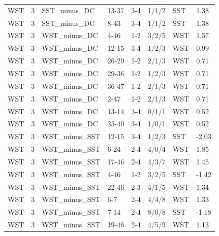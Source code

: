 \begin{table}[!h]
\begin{tabular}[t]{lrllllll}
WST & 3 & SST_minus_DC & 13-37 & 3-4 & 1/1/2 & SST & 1.38\\
WST & 3 & SST_minus_DC & 8-43 & 3-4 & 1/1/2 & SST & 1.38\\
WST & 3 & WST_minus_DC & 4-46 & 1-2 & 3/2/5 & WST & 1.57\\
WST & 3 & WST_minus_DC & 12-15 & 3-4 & 1/2/3 & WST & 0.99\\
\addlinespace
WST & 3 & WST_minus_DC & 26-29 & 1-2 & 2/1/3 & WST & 0.71\\
WST & 3 & WST_minus_DC & 29-36 & 1-2 & 1/2/3 & WST & 0.71\\
WST & 3 & WST_minus_DC & 36-47 & 1-2 & 2/1/3 & WST & 0.71\\
WST & 3 & WST_minus_DC & 2-47 & 1-2 & 2/1/3 & WST & 0.71\\
WST & 3 & WST_minus_DC & 13-14 & 3-4 & 0/1/1 & WST & 0.52\\
\addlinespace
WST & 3 & WST_minus_DC & 35-40 & 3-4 & 1/0/1 & WST & 0.52\\
WST & 3 & WST_minus_SST & 12-15 & 3-4 & 1/2/3 & SST & -2.03\\
WST & 3 & WST_minus_SST & 6-24 & 2-4 & 4/0/4 & WST & 1.85\\
WST & 3 & WST_minus_SST & 17-46 & 2-4 & 4/3/7 & WST & 1.45\\
WST & 3 & WST_minus_SST & 4-46 & 1-2 & 3/2/5 & SST & -1.42\\
\addlinespace
WST & 3 & WST_minus_SST & 22-46 & 2-3 & 4/1/5 & WST & 1.34\\
WST & 3 & WST_minus_SST & 6-7 & 2-4 & 4/4/8 & WST & 1.33\\
WST & 3 & WST_minus_SST & 7-14 & 2-4 & 8/0/8 & SST & -1.18\\
WST & 3 & WST_minus_SST & 19-46 & 2-4 & 4/5/9 & WST & 1.13\\
\bottomrule
\end{tabular}
\end{table}
